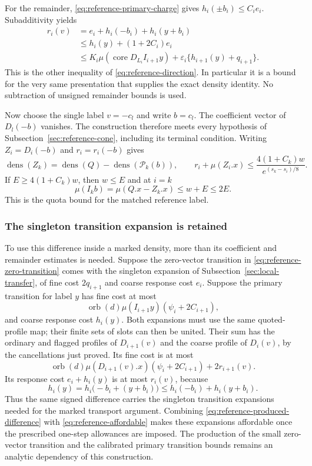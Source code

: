 For the remainder, \eqref{eq:reference-primary-charge} gives
$h_i(\pm b_i)\le C_i e_i$. Subadditivity yields
\begin{align*}
 r_i(v)&=e_i+h_i(-b_i)+h_i(y+b_i)\\
       &\le h_i(y)+(1+2C_i)e_i\\
       &\le K_i\mu(\operatorname{core}D_{L_i}I_{i+1}y)
                         +\varepsilon_i\{h_{i+1}(y)+q_{i+1}\}.
\end{align*}
This is the other inequality of
\eqref{eq:reference-direction}. In particular it is a bound
for the very same presentation that supplies the exact density
identity. No subtraction of unsigned remainder bounds is used.

Now choose the single label $v=-c_l$ and write $b=c_l$.
The coefficient vector of $D_l(-b)$ vanishes. The construction
therefore meets every hypothesis of
Subsection~\ref{sec:reference-cone}, including its terminal condition.
Writing $Z_i=D_i(-b)$ and $r_i=r_i(-b)$ gives
\begin{equation}\label{eq:reference-produced-difference}
 \operatorname{dens}(Z_k)
       =\operatorname{dens}(Q)-\operatorname{dens}(\mathcal P_k(b)),
 \qquad
 r_i+\mu(Z_i.x)\le\frac{4(1+C_k)w}{e^{(s_k-s_i)/8}}.
\end{equation}
If $E\ge4(1+C_k)w$, then $w\le E$ and at $i=k$
\[
              \mu(I_k b)=\mu(Q.x-Z_k.x)\le w+E\le2E.
\]
This is the quota bound for the matched reference label.

\subsubsection{The singleton transition expansion is retained}
To use this difference inside a marked density, more than its
coefficient and remainder estimates is needed. Suppose the
zero-vector transition in \eqref{eq:reference-zero-transition}
comes with the singleton expansion of
Subsection~\ref{sec:local-transfer}, of fine cost $2q_{i+1}$ and
coarse response cost $e_i$. Suppose the primary transition for
label $y$ has fine cost at most
\[
 \operatorname{orb}(d)\mu(I_{i+1}y)
                            (\psi_i+2C_{i+1}),
\]
and coarse response cost $h_i(y)$. Both expansions must use the
same quoted-profile map; their finite sets of slots can then be
united. Their sum has the ordinary and flagged profiles of
$D_{i+1}(v)$ and the coarse profile of $D_i(v)$, by the
cancellations just proved. Its fine cost is at most
\[
 \operatorname{orb}(d)\mu(D_{i+1}(v).x)
           (\psi_i+2C_{i+1})+2r_{i+1}(v).
\]
Its response cost $e_i+h_i(y)$ is at most $r_i(v)$, because
\[
 h_i(y)=h_i\bigl(-b_i+(y+b_i)\bigr)
                           \le h_i(-b_i)+h_i(y+b_i).
\]
Thus the same signed difference carries the singleton transition
expansions needed for the marked transport argument. Combining
\eqref{eq:reference-produced-difference} with
\eqref{eq:reference-affordable} makes these expansions affordable
once the prescribed one-step allowances are imposed. The
production of the small zero-vector transition and the calibrated
primary transition bounds remains an analytic dependency of this
construction.
